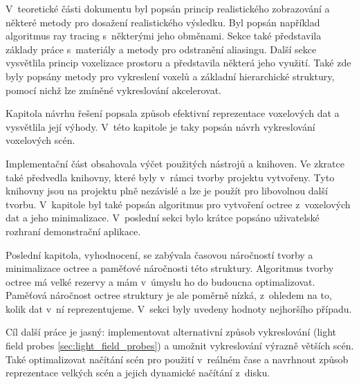 V~teoretické části dokumentu byl popsán princip realistického zobrazování a některé metody pro dosažení realistického výsledku. Byl popsán například algoritmus ray tracing s~některými jeho obměnami. Sekce také představila základy práce s~materiály a metody pro odstranění aliasingu. Další sekce vysvětlila princip voxelizace prostoru a představila některá jeho využití. Také zde byly popsány metody pro vykreslení voxelů a základní hierarchické struktury, pomocí nichž lze zmíněné vykreslování akcelerovat.

Kapitola návrhu řešení popsala způsob efektivní reprezentace voxelových dat a vysvětlila její výhody. V~této kapitole je taky popsán návrh vykreslování voxelových scén.

Implementační část obsahovala výčet použitých nástrojů a knihoven. Ve zkratce také předvedla knihovny, které byly v~rámci tvorby projektu vytvořeny. Tyto knihovny jsou na projektu plně nezávislé a lze je použít pro libovolnou další tvorbu. V~kapitole byl také popsán algoritmus pro vytvoření octree z~voxelových dat a jeho minimalizace. V~poslední sekci bylo krátce popsáno uživatelské rozhraní demonstrační aplikace.

Poslední kapitola, vyhodnocení, se zabývala časovou náročností tvorby a minimalizace octree a paměťové náročnosti této struktury. Algoritmus tvorby octree má velké rezervy a mám v~úmyslu ho do budoucna optimalizovat. Paměťová náročnost octree struktury je ale poměrně nízká, z~ohledem na to, kolik dat v~ní reprezentujeme. V~sekci byly uvedeny hodnoty nejhoršího případu.

Cíl další práce je jasný: implementovat alternativní způsob vykreslování (light field probes \ref{sec:light_field_probes}) a umožnit vykreslování výrazně větších scén. Také optimalizovat načítání scén pro použití v~reálném čase a navrhnout způsob reprezentace velkých scén a jejich dynamické načítání z~disku.


